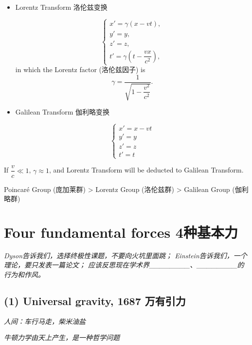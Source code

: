 
\begin{itemize}
\tightlist{}
\item
  Lorentz Transform 洛伦兹变换

  \[\left\{ 
        \begin{array}{l}
            x'=\gamma (x-vt), \\
            y'=y, \\
            z'=z,\\
            t'=\gamma (t-\dfrac{vx}{c^2}),
        \end{array}
    \right.\] in which the Lorentz factor (洛伦兹因子) is
  \[\gamma=\dfrac{1}{\sqrt{1-\dfrac{v^2}{c^2}}}.\]
\item
  Galilean Transform 伽利略变换

  \[\left\{
        \begin{array}{l}
            x'=x-vt \\
            y'=y \\
            z'=z\\
            t'=t
        \end{array}
    \right.\]
\end{itemize}

If \(\dfrac{v}{c} \ll 1\), \(\gamma \approx 1\), and Lorentz Transform will be deducted to Galilean Transform.

Poincaré Group (庞加莱群) \textgreater{} Lorentz Group (洛伦兹群) \textgreater{} Galilean Group (伽利略群)

\section{Four fundamental forces 4种基本力}\label{four-fundamental-forces-4ux79cdux57faux672cux529b}

\emph{Dyson告诉我们，选择终极性课题，不要向火坑里面跳；
Einstein告诉我们，一个理论，要只发表一篇论文；
应该反思现在学术界\_\_\_\_\_\_\_\_、\_\_\_\_\_\_\_\_的行为和作风。}

\subsection*{(1) Universal gravity, 1687 万有引力}\label{universal-gravity-1687-ux4e07ux6709ux5f15ux529b}

\emph{人间：车行马走，柴米油盐}

\emph{牛顿力学由天上产生，是一种哲学问题}

